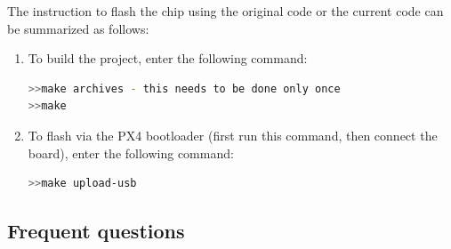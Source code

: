 \documentclass[idxtotoc,hyperref,openany]{labbook} %
\begin{document}
The instruction to flash the chip using the original code or the current code can be summarized as follows:

\begin{enumerate}
\item To build the project, enter the following command:
\begin{lstlisting}[language=bash]
>>make archives - this needs to be done only once
>>make
\end{lstlisting}
\item To flash via the PX4 bootloader (first run this command, then connect the board), enter the following command:
\begin{lstlisting}[language=bash]
>>make upload-usb
\end{lstlisting}
\end{enumerate}

\subsection{Frequent questions}
\end{document}
